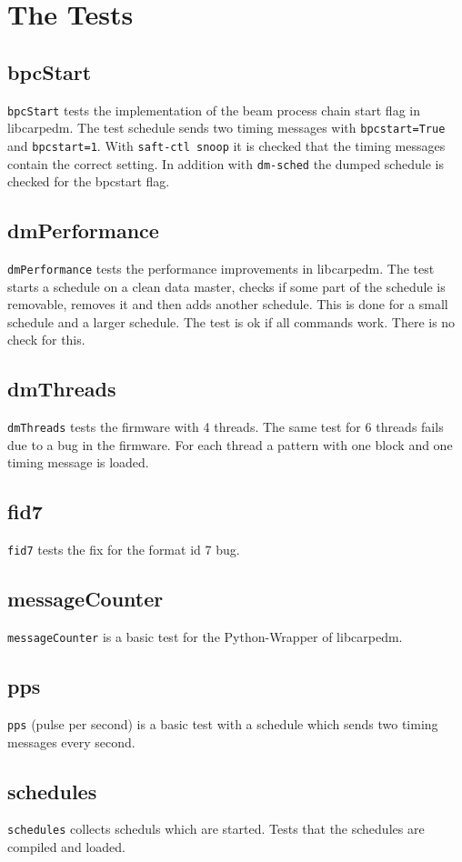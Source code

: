 \documentclass[12pt,a4paper]{report}
\begin{document}
\chapter{The Tests}
\section{bpcStart}
\texttt{bpcStart} tests the implementation of the beam process chain start flag in libcarpedm. 
The test schedule sends two timing messages with \texttt{bpcstart=True} and \texttt{bpcstart=1}.
With \texttt{saft-ctl snoop} it is checked that the timing messages contain the correct setting. 
In addition with \texttt{dm-sched} the dumped schedule is checked for the bpcstart flag.
\section{dmPerformance}
\texttt{dmPerformance} tests the performance improvements in libcarpedm.
The test starts a schedule on a clean data master, checks if some part of the schedule is removable, removes it and 
then adds another schedule. This is done for a small schedule and a larger schedule. The test is ok if all commands 
work. There is no check for this.
\section{dmThreads}
\texttt{dmThreads} tests the firmware with 4 threads. The same test for 6 threads fails due to a bug in the 
firmware. For each thread a pattern with one block and one timing message is loaded.
\section{fid7}
\texttt{fid7} tests the fix for the format id 7 bug.

\section{messageCounter}
\texttt{messageCounter} is a basic test for the Python-Wrapper of libcarpedm.
\section{pps}
\texttt{pps} (pulse per second) is a basic test with a schedule which sends two timing messages every second.
\section{schedules}
\texttt{schedules} collects scheduls which are started. Tests that the schedules are compiled and loaded.

\end{document}
